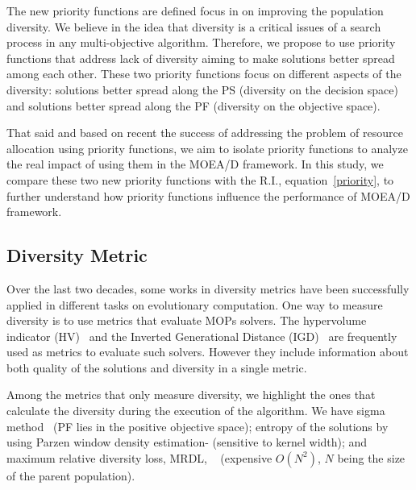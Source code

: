 The new priority functions are defined focus in on improving the population diversity. We believe in the idea that diversity is a critical issues of a search process in any multi-objective algorithm. Therefore, we propose to use priority functions that address lack of diversity aiming to make solutions better spread among each other. These two priority functions focus on different aspects of the diversity: solutions better spread along the PS (diversity on the decision space) and solutions better spread along the PF (diversity on the objective space).

That said and based on recent the success of addressing the problem of resource allocation using priority functions, we aim to isolate priority functions to analyze the real impact of using them in the MOEA/D framework. In this study, we compare these two new priority functions with the R.I., equation~\ref{priority}, to further understand how priority functions influence the performance of MOEA/D framework.




\subsection{Diversity Metric}


Over the last two decades, some works in diversity metrics have been successfully applied in different tasks on evolutionary computation. One way to measure diversity is to use metrics that evaluate MOPs solvers. The hypervolume indicator (HV)~\cite{zitzler1998multiobjective} and the Inverted Generational Distance (IGD)~\cite{zhang2008rm} are frequently used as metrics to evaluate such solvers. However they include information about both quality of the solutions and diversity in a single metric.

Among the metrics that only measure diversity, we highlight the ones that calculate the diversity during the execution of the algorithm. We have sigma method~\cite{mostaghim2003strategies}  (PF lies in the positive objective space); entropy of the solutions by using Parzen window density estimation-\cite{tan2008evolutionary} (sensitive to kernel width); and maximum relative diversity loss, MRDL, ~\cite{gee2015online} (expensive $O(N^2)$, $N$ being the size of the parent population).


